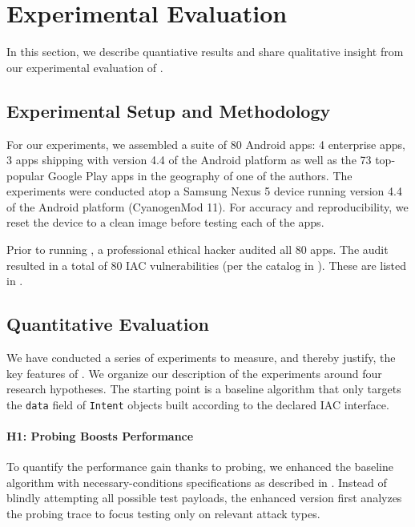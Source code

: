 \section{Experimental Evaluation}\label{Se:evaluation}

In this section, we describe quantiative results and share qualitative insight from our experimental evaluation of \Tool. 

\subsection{Experimental Setup and Methodology}

For our experiments, we assembled a suite of 80 Android apps: 4 enterprise apps, 3 apps shipping with version 4.4 of the Android platform as well as the 73 top-popular Google Play apps in the geography of one of the authors.
The experiments were conducted atop a Samsung Nexus 5 device running version 4.4 of the Android platform (CyanogenMod 11). For accuracy and reproducibility, we reset the device to a clean image before testing each of the apps.

Prior to running \Tool, a professional ethical hacker audited all 80 apps. The audit resulted in a total of 80 IAC vulnerabilities (per the catalog in ). These are listed in .

\subsection{Quantitative Evaluation}

We have conducted a series of experiments to measure, and thereby justify, the key features of \Tool. We organize our description of the experiments around four research hypotheses. The starting point is a baseline algorithm that only targets the {\tt data} field of {\tt Intent} objects built according to the declared IAC interface.

\paragraph{H1: Probing Boosts Performance} To quantify the performance gain thanks to probing, we enhanced the baseline algorithm with necessary-conditions specifications as described in . Instead of blindly attempting all possible test payloads, the enhanced version first analyzes the probing trace to focus testing only on relevant attack types.

